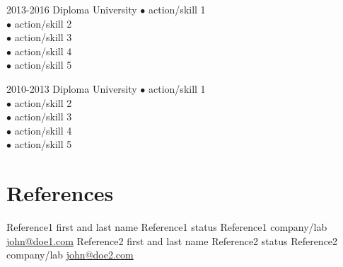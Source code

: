\documentclass[]{friggeri-cv}
\begin{document}
		\begin{entrylist}


			\Education
			{2013-2016}
			{Diploma}
			{University}
			{$\bullet$ action/skill 1\\
			$\bullet$ action/skill 2\\
			$\bullet$ action/skill 3\\
			$\bullet$ action/skill 4\\
			$\bullet$ action/skill 5\\}

			\Education
			{2010-2013}
			{Diploma}
			{University}
			{$\bullet$ action/skill 1\\
			$\bullet$ action/skill 2\\
			$\bullet$ action/skill 3\\
			$\bullet$ action/skill 4\\
			$\bullet$ action/skill 5\\}


		\end{entrylist}


	\section{\faEdit\space References}

		\begin{RefList}

			\Reference
			{Reference1 first and last name}
			{Reference1 status}
			{Reference1 company/lab}
			{\href{mailto:john@doe1.com}{\faInbox\space john@doe1.com}}
			{Reference2 first and last name}
			{Reference2 status}
			{Reference2 company/lab}
			{\href{mailto:john@doe2.com}{\faInbox\space john@doe2.com}}

		\end{RefList}

\end{document}
